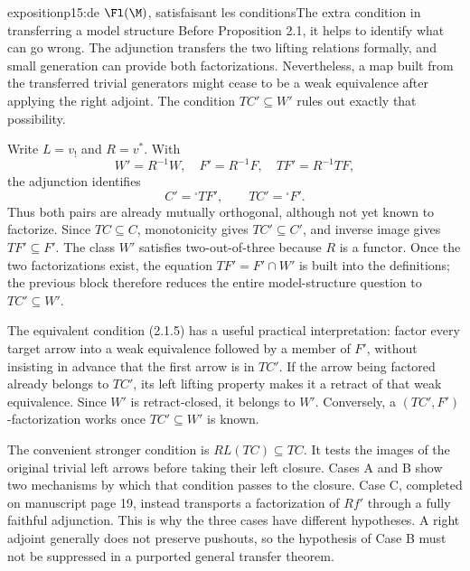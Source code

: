 \begin{dcomment}{exposition}{p15:de $\Fl(\M)$, satisfaisant les conditions}{The extra condition in transferring a model structure}
Before Proposition 2.1, it helps to identify what can go wrong. The adjunction transfers the two lifting relations formally, and small generation can provide both factorizations. Nevertheless, a map built from the transferred trivial generators might cease to be a weak equivalence after applying the right adjoint. The condition $TC'\subseteq W'$ rules out exactly that possibility.

Write $L=v_!$ and $R=v^*$. With
\[
 W'=R^{-1}W,\quad F'=R^{-1}F,\quad
 TF'=R^{-1}TF,
\]
the adjunction identifies
\[
 C'={}^{\square}TF',\qquad TC'={}^{\square}F'.
\]
Thus both pairs are already mutually orthogonal, although not yet known to factorize. Since $TC\subseteq C$, monotonicity gives $TC'\subseteq C'$, and inverse image gives $TF'\subseteq F'$. The class $W'$ satisfies two-out-of-three because $R$ is a functor. Once the two factorizations exist, the equation $TF'=F'\cap W'$ is built into the definitions; the previous block therefore reduces the entire model-structure question to $TC'\subseteq W'$.

The equivalent condition (2.1.5) has a useful practical interpretation: factor every target arrow into a weak equivalence followed by a member of $F'$, without insisting in advance that the first arrow is in $TC'$. If the arrow being factored already belongs to $TC'$, its left lifting property makes it a retract of that weak equivalence. Since $W'$ is retract-closed, it belongs to $W'$. Conversely, a $(TC',F')$-factorization works once $TC'\subseteq W'$ is known.

The convenient stronger condition is $RL(TC)\subseteq TC$. It tests the images of the original trivial left arrows before taking their left closure. Cases A and B show two mechanisms by which that condition passes to the closure. Case C, completed on manuscript page 19, instead transports a factorization of $Rf'$ through a fully faithful adjunction. This is why the three cases have different hypotheses. A right adjoint generally does not preserve pushouts, so the hypothesis of Case B must not be suppressed in a purported general transfer theorem.
\end{dcomment}

